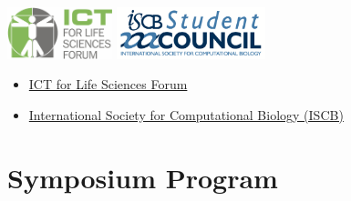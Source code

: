 \documentclass[10pt,]{article}
\begin{document}
 \vspace{2ex}
\begin{minipage}[c]{0.5\columnwidth}
    \centering
    \includegraphics[height=15mm]{./images/ICT-for-Life-Sciences-Forum-logo.png}\quad
    \includegraphics[height=15mm]{./images/ISCBSC-logo.png}
\end{minipage}
\begin{minipage}[c]{0.5\columnwidth}
\begin{itemize}
    \itemsep1pt\parskip0pt
    \item
      \href{http://www.ict4lifesciences.org.au}{ICT for Life Sciences Forum}
    \item
      \href{http://www.iscb.org}{International Society for Computational
      Biology (ISCB)}
    \end{itemize}
\end{minipage}


\vfill
\pagebreak
\null
\vfill
\section{Symposium Program}

\centering
\end{document}
